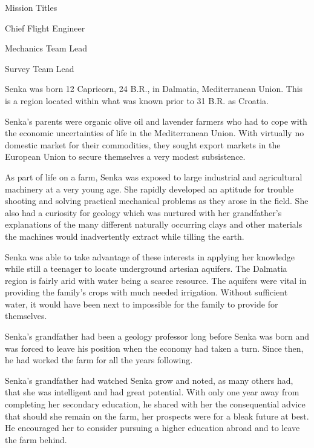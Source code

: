 {        \bTR
            \bTC Mission Titles \eTC
            \bTC 
                \startitemize[4]
                \startpacked
                \item Chief Flight Engineer
                \item Mechanics Team Lead
                \item Survey Team Lead
                \stoppacked
                \stopitemize
            \eTC
        \eTR
    \eTABLEbody

\eTABLE
}

Senka was born 12 Capricorn, 24 B.R., in Dalmatia, Mediterranean Union. This is a region located within what was known prior to 31 B.R. as Croatia.

Senka's parents were organic olive oil and lavender farmers who had to cope with the economic uncertainties of life in the Mediterranean Union. With virtually no domestic market for their commodities, they sought export markets in the European Union to secure themselves a very modest subsistence.

As part of life on a farm, Senka was exposed to large industrial and agricultural machinery at a very young age. She rapidly developed an aptitude for trouble shooting and solving practical mechanical problems as they arose in the field. She also had a curiosity for geology which was nurtured with her grandfather's explanations of the many different naturally occurring clays and other materials the machines would inadvertently extract while tilling the earth. 

Senka was able to take advantage of these interests in applying her knowledge while still a teenager to locate underground artesian aquifers. The Dalmatia region is fairly arid with water being a scarce resource. The aquifers were vital in providing the family's crops with much needed irrigation. Without sufficient water, it would have been next to impossible for the family to provide for themselves.

Senka's grandfather had been a geology professor long before Senka was born and was forced to leave his position when the economy had taken a turn. Since then, he had worked the farm for all the years following. 

Senka's grandfather had watched Senka grow and noted, as many others had, that she was intelligent and had great potential. With only one year away from completing her secondary education, he shared with her the consequential advice that should she remain on the farm, her prospects were for a bleak future at best. He encouraged her to consider pursuing a higher education abroad and to leave the farm behind.

